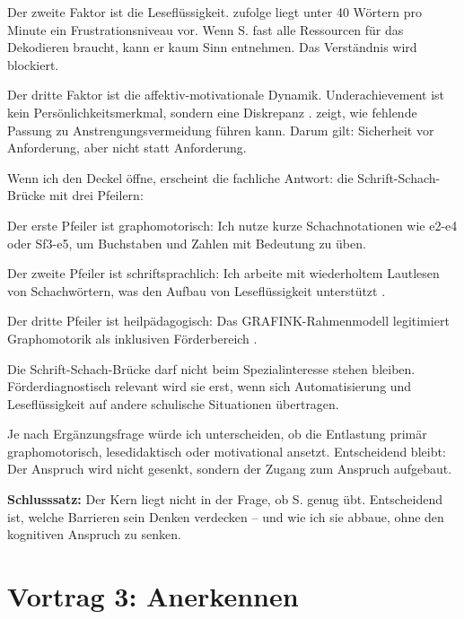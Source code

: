 \documentclass[ngerman, a4paper]{article}
\begin{document}
Der zweite Faktor ist die Leseflüssigkeit. \textcite{gold2018lesenkannmanlernen}
zufolge liegt unter 40 Wörtern pro Minute ein Frustrationsniveau vor. Wenn S.
fast alle Ressourcen für das Dekodieren braucht, kann er kaum Sinn entnehmen.
Das Verständnis wird blockiert.

Der dritte Faktor ist die affektiv-motivationale Dynamik. Underachievement ist
kein Persönlichkeitsmerkmal, sondern eine Diskrepanz \parencite{greiten2021underachievement}.
\textcite{lehwald2017motivation} zeigt, wie fehlende Passung zu
Anstrengungsvermeidung führen kann. Darum gilt: Sicherheit vor Anforderung, aber
nicht statt Anforderung.

Wenn ich den Deckel öffne, erscheint die fachliche Antwort: die
Schrift-Schach-Brücke mit drei Pfeilern:

Der erste Pfeiler ist graphomotorisch: Ich nutze kurze Schachnotationen wie
e2-e4 oder Sf3-e5, um Buchstaben und Zahlen mit Bedeutung zu üben.

Der zweite Pfeiler ist schriftsprachlich: Ich arbeite mit wiederholtem Lautlesen
von Schachwörtern, was den Aufbau von Leseflüssigkeit unterstützt
\parencite{gold2018lesenkannmanlernen}.

Der dritte Pfeiler ist heilpädagogisch: Das GRAFINK-Rahmenmodell legitimiert
Graphomotorik als inklusiven Förderbereich \parencite{saegesserwyss2021grafinkrahmenmodell}.

Die Schrift-Schach-Brücke darf nicht beim Spezialinteresse stehen bleiben.
Förderdiagnostisch relevant wird sie erst, wenn sich Automatisierung und
Leseflüssigkeit auf andere schulische Situationen übertragen.

Je nach Ergänzungsfrage würde ich unterscheiden, ob die Entlastung primär
graphomotorisch, lesedidaktisch oder motivational ansetzt. Entscheidend bleibt:
Der Anspruch wird nicht gesenkt, sondern der Zugang zum Anspruch aufgebaut.

\textbf{Schlusssatz:} Der Kern liegt nicht in der Frage, ob S. genug übt.
Entscheidend ist, welche Barrieren sein Denken verdecken -- und wie ich sie
abbaue, ohne den kognitiven Anspruch zu senken.

\newpage

\section{Vortrag 3: Anerkennen}
\label{sec:vortrag3}
\end{document}
